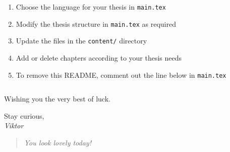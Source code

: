 {    \begin{enumerate}
        \item Choose the language for your thesis in \texttt{main.tex}
        \item Modify the thesis structure in \texttt{main.tex} as required
        \item Update the files in the \texttt{content/} directory
        \item Add or delete chapters according to your thesis needs
        \item To remove this README, comment out the line below in \texttt{main.tex}
        \vspace*{-1.1em}\begin{verbatim}

        \end{verbatim}
    \end{enumerate}
    
    \noindent Wishing you the very best of luck.

    \vspace{.69em}

    \noindent Stay curious,\\
    \textit{Viktor}

    \newpage
    \thispagestyle{empty}
    \vspace*{8em}
    \begin{quote}
        \centering
        \textit{You look lovely today!}\\
    \end{quote}
}

\clearpage %
\restoregeometry %